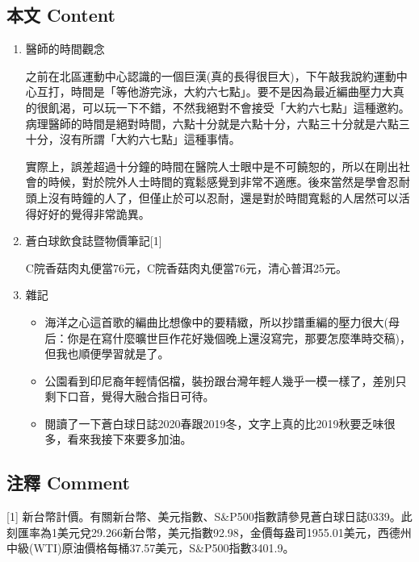 \documentclass[
]{article}
\providecommand{\tightlist}{%
  \setlength{\itemsep}{0pt}\setlength{\parskip}{0pt}}
\begin{document}
\hypertarget{ux672cux6587-content-9}{%
\subsection{本文 Content}\label{ux672cux6587-content-9}}

\begin{enumerate}
\def\labelenumi{\arabic{enumi}.}
\item
  醫師的時間觀念

  之前在北區運動中心認識的一個巨漢(真的長得很巨大)，下午敲我說約運動中心互打，時間是「等他游完泳，大約六七點」。要不是因為最近編曲壓力大真的很飢渴，可以玩一下不錯，不然我絕對不會接受「大約六七點」這種邀約。病理醫師的時間是絕對時間，六點十分就是六點十分，六點三十分就是六點三十分，沒有所謂「大約六七點」這種事情。

  實際上，誤差超過十分鐘的時間在醫院人士眼中是不可饒恕的，所以在剛出社會的時候，對於院外人士時間的寬鬆感覺到非常不適應。後來當然是學會忍耐頭上沒有時鐘的人了，但僅止於可以忍耐，還是對於時間寬鬆的人居然可以活得好好的覺得非常詭異。
\item
  蒼白球飲食誌暨物價筆記{[}1{]}

  C院香菇肉丸便當76元，C院香菇肉丸便當76元，清心普洱25元。
\item
  雜記

  \begin{itemize}
  \tightlist
  \item
    海洋之心這首歌的編曲比想像中的要精緻，所以抄譜重編的壓力很大(母后：你是在寫什麼曠世巨作花好幾個晚上還沒寫完，那要怎麼準時交稿)，但我也順便學習就是了。
  \item
    公園看到印尼裔年輕情侶檔，裝扮跟台灣年輕人幾乎一模一樣了，差別只剩下口音，覺得大融合指日可待。
  \item
    閱讀了一下蒼白球日誌2020春跟2019冬，文字上真的比2019秋要乏味很多，看來我接下來要多加油。
  \end{itemize}
\end{enumerate}

\hypertarget{ux6ce8ux91cb-comment-9}{%
\subsection{注釋 Comment}\label{ux6ce8ux91cb-comment-9}}

{[}1{]}
新台幣計價。有關新台幣、美元指數、S\&P500指數請參見蒼白球日誌0339。此刻匯率為1美元兌29.266新台幣，美元指數92.98，金價每盎司1955.01美元，西德州中級(WTI)原油價格每桶37.57美元，S\&P500指數3401.9。
\end{document}
